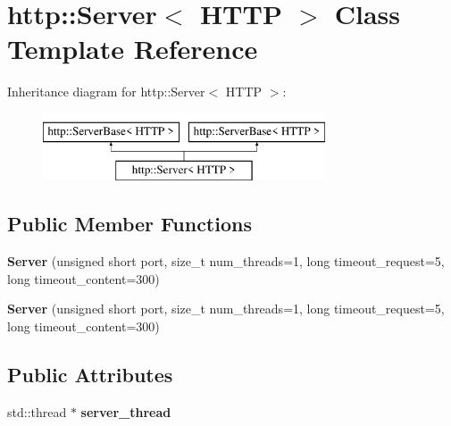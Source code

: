 \hypertarget{classhttp_1_1_server_3_01_h_t_t_p_01_4}{}\section{http\+:\+:Server$<$ H\+T\+TP $>$ Class Template Reference}
\label{classhttp_1_1_server_3_01_h_t_t_p_01_4}
Inheritance diagram for http\+:\+:Server$<$ H\+T\+TP $>$\+:\begin{figure}[H]
\begin{center}
\leavevmode
\includegraphics[height=2.000000cm]{dc/d6c/classhttp_1_1_server_3_01_h_t_t_p_01_4}
\end{center}
\end{figure}
\subsection*{Public Member Functions}
\begin{DoxyCompactItemize}
\item 
\mbox{\label{classhttp_1_1_server_3_01_h_t_t_p_01_4_a412af830316f5e767aa5fa9004cc5877}} 
{\bfseries Server} (unsigned short port, size\+\_\+t num\+\_\+threads=1, long timeout\+\_\+request=5, long timeout\+\_\+content=300)
\item 
\mbox{\label{classhttp_1_1_server_3_01_h_t_t_p_01_4_a412af830316f5e767aa5fa9004cc5877}} 
{\bfseries Server} (unsigned short port, size\+\_\+t num\+\_\+threads=1, long timeout\+\_\+request=5, long timeout\+\_\+content=300)
\end{DoxyCompactItemize}
\subsection*{Public Attributes}
\begin{DoxyCompactItemize}
\item 
\mbox{\label{classhttp_1_1_server_3_01_h_t_t_p_01_4_abc179bfd787206dd17b73b4ce4ee4e52}} 
std\+::thread $\ast$ {\bfseries server\+\_\+thread}
\end{DoxyCompactItemize}
